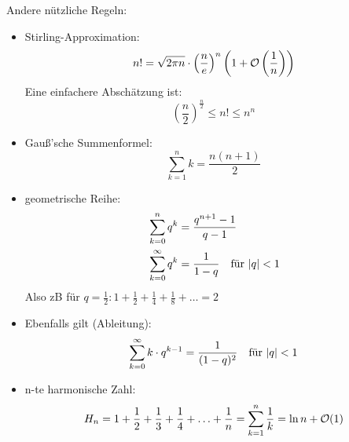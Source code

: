         Andere nützliche Regeln:
        \begin{itemize}
            \item Stirling-Approximation:
            $$
                n! = \sqrt{2 \pi n} \cdot \left(\frac{n}{e}\right)^n \left(1+\mathcal{O}\left(\frac{1}{n}\right)\right)
            $$
            Eine einfachere Abschätzung ist:
            $$
                \left(\frac{n}{2}\right)^{\frac{n}{2}} \leq n! \leq n^n
            $$
            \item Gauß'sche Summenformel:
            $$
                \sum \limits_{k=1}^n k = \frac{n(n+1)}{2}
            $$
            \item geometrische Reihe:
            \begin{align*}
                &\sum \limits_{k=0}^n q^k = \frac{q^{n+1}-1}{q-1} \\
                &\sum \limits_{k=0}^\infty q^k = \frac{1}{1-q} \ \ \text{  für } \abs{q} < 1
            \end{align*}
            Also zB für $q= \frac{1}{2}: 1 + \frac{1}{2} + \frac{1}{4} + \frac{1}{8} + \ldots = 2$ 
            \item Ebenfalls gilt (Ableitung):
            $$
                \sum \limits_{k=0}^\infty k \cdot q^{k-1} = \frac{1}{(1-q)^2} \ \ \text{  für } \lvert q\rvert < 1
            $$ 
            \item n-te harmonische Zahl:
            $$
                H_n = 1 + \frac{1}{2} + \frac{1}{3} + \frac{1}{4} + \ldots + \frac{1}{n} = \sum \limits_{k=1}^n \frac{1}{k} = \ln n + \mathcal{O}(1)
            $$
        \end{itemize}

